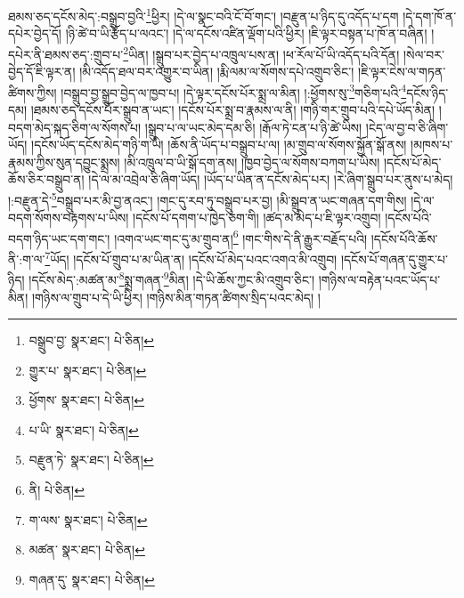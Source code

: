 ཐམས་ཅད་དངོས་མེད་:བསྒྲུབ་བྱའི་\footnote{བསྒྲུབ་བྱ་  སྣར་ཐང་།  པེ་ཅིན། }ཕྱིར། །དེ་ལ་སྣང་བའི་ངོ་བོ་གང་། །བརྫུན་པ་ཉིད་དུ་འདོད་པ་དག །དེ་དག་ཁོ་ན་དཔེར་བྱེད་དོ། །ཉི་ཚེ་བ་ཡི་རྩོད་པ་ལའང་། །དེ་ལ་དངོས་འཛིན་ལྡོག་པའི་ཕྱིར། །ཇི་ལྟར་བསྟན་པ་ཁོ་ན་བཞིན། །དཔེར་ནི་ཐམས་ཅད་:གྲུབ་པ་\footnote{གྱུར་པ་  སྣར་ཐང་།  པེ་ཅིན། }ཡིན། །སྒྲུབ་པར་བྱེད་པ་འཁྲུལ་པས་ན། །ཕ་རོལ་པོ་ཡི་འདོད་པའི་དོན། །སེལ་བར་བྱེད་དོ་ཇི་ལྟར་ན། །མི་འདོད་ཐལ་བར་འགྱུར་བ་ཡིན། །རྨི་ལམ་ལ་སོགས་དཔེ་འགྲུབ་ཅིང་། །ཇི་ལྟར་ངེས་ལ་གཏན་ཚིགས་ཀྱིས། །བསྒྲུབ་བྱ་སྒྲུབ་བྱེད་ལ་ཁྱབ་པ། །དེ་ལྟར་དངོས་པོར་སྨྲ་ལ་མིན། །:ཕྱོགས་སུ་\footnote{ཕྱོགས་  སྣར་ཐང་།  པེ་ཅིན། }གཅིག་པའི་\footnote{པ་ཡི་  སྣར་ཐང་།  པེ་ཅིན། }དངོས་ཉིད་དམ། །ཐམས་ཅད་དངོས་པོར་སྒྲུབ་ན་ཡང་། །དངོས་པོར་སྨྲ་བ་རྣམས་ལ་ནི། །གཉི་གར་གྲུབ་པའི་དཔེ་ཡོད་མིན། །བདག་མེད་སྐད་ཅིག་ལ་སོགས་པ། །སྒྲུབ་པ་ལ་ཡང་མེད་དམ་ཅི། །རྒོལ་ཏེ་ངན་པ་ཉི་ཚེ་ཡིས། །ངེད་ལ་བྱ་བ་ཅི་ཞིག་ཡོད། །དངོས་ཡོད་དངོས་མེད་གཉི་ག་ཡི། །ཆོས་ནི་ཡོད་པ་བསྒྲུབ་པ་ལ། །མ་གྲུབ་ལ་སོགས་སྐྱོན་སྒོ་ནས། །མཁས་པ་རྣམས་ཀྱིས་སུན་དབྱུང་སྨྲས། །མི་འཁྲུལ་བ་ཡི་སྒོ་དག་ནས། །ཁྱབ་བྱེད་ལ་སོགས་བཀག་པ་ཡིས། །དངོས་པོ་མེད་ཆོས་ཅིར་བསྒྲུབ་ན། །དེ་ལ་མ་འབྲེལ་ཅི་ཞིག་ཡོད། །ཡོད་པ་ཡིན་ན་དངོས་མེད་པར། །རེ་ཞིག་སྒྲུབ་པར་ནུས་པ་མེད། །:བརྫུན་དེ་\footnote{བརྫུན་ཏེ་  སྣར་ཐང་།  པེ་ཅིན། }བསྒྲུབ་པར་མི་བྱ་ནའང་། །གང་དུ་རབ་ཏུ་བསྒྲུབ་པར་བྱ། །མི་སྒྲུབ་ན་ཡང་གཞན་དག་གིས། །དེ་ལ་བདག་སོགས་བརྟགས་པ་ཡིས། །དངོས་པོ་དགག་པ་ཁྱེད་ཅག་གི། །ཚད་མ་མེད་པ་ཇི་ལྟར་འགྲུབ། །དངོས་པོའི་བདག་ཉིད་ཡང་དག་གང་། །འགའ་ཡང་གང་དུ་མ་གྲུབ་ན།\footnote{ནི།  པེ་ཅིན། } །གང་གིས་དེ་ནི་རྒྱུར་བརྗོད་པའི། །དངོས་པོའི་ཆོས་ནི་:ག་ལ་\footnote{ག་ལས་  སྣར་ཐང་།  པེ་ཅིན། }ཡོད། །དངོས་པོ་གྲུབ་པ་མ་ཡིན་ན། །དངོས་པོ་མེད་པའང་འགའ་མི་འགྲུབ། །དངོས་པོ་གཞན་དུ་གྱུར་པ་ཉིད། །དངོས་མེད་:མཚན་མ་\footnote{མཚན་  སྣར་ཐང་།  པེ་ཅིན། }སྨྲ་གཞན་\footnote{གཞན་དུ་  སྣར་ཐང་།  པེ་ཅིན། }མིན། །དེ་ཡི་ཆོས་ཀྱང་མི་འགྲུབ་ཅིང་། །གཉིས་ལ་བརྟེན་པའང་ཡོད་པ་མིན། །གཉིས་ལ་གྲུབ་པ་དེ་ཡི་ཕྱིར། །གཉིས་མིན་གཏན་ཚིགས་སྲིད་པའང་མེད། །
